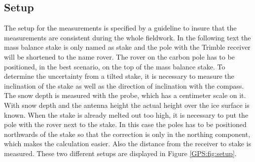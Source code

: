 \subsection{Setup} \label{GPS:subsec:setup}

The setup for the measurements is specified by a guideline to insure that the measurements are consistent during the whole fieldwork.
In the following text the mass balance stake is only named as stake and the pole with the Trimble receiver will be shortened to the name rover.
The rover on the carbon pole has to be positioned, in the best scenario, on the top of the mass balance stake.
To determine the uncertainty from a tilted stake, it is necessary to measure the inclination of the stake as well as the direction of inclination with the compass.
The snow depth is measured with the probe, which has a centimeter scale on it.
With snow depth and the antenna height the actual height over the ice surface is known. 
When the stake is already melted out too high, it is necessary to put the pole with the rover next to the stake. 
In this case the poles has to be positioned northwards of the stake so that the correction is only in the northing component, which makes the calculation easier. 
Also the distance from the receiver to stake is measured.
These two different setups are displayed in Figure \ref{GPS:fig:setup}.

